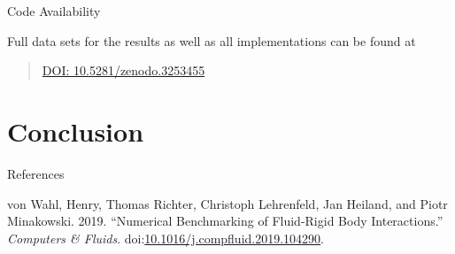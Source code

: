 \begin{frame}{Code Availability}

Full data sets for the results as well as all implementations can be
found at

\begin{quote}
\href{https://doi.org/10.5281/zenodo.3253455}{DOI:
10.5281/zenodo.3253455}
\end{quote}

\end{frame}

\section{Conclusion}\label{conclusion}

\begin{frame}{References}

\hypertarget{refs}{}
\hypertarget{ref-WahRLHM19}{}
von Wahl, Henry, Thomas Richter, Christoph Lehrenfeld, Jan Heiland, and
Piotr Minakowski. 2019. ``Numerical Benchmarking of Fluid-Rigid Body
Interactions.'' \emph{Computers \& Fluids}.
doi:\href{https://doi.org/10.1016/j.compfluid.2019.104290}{10.1016/j.compfluid.2019.104290}.

\end{frame}
